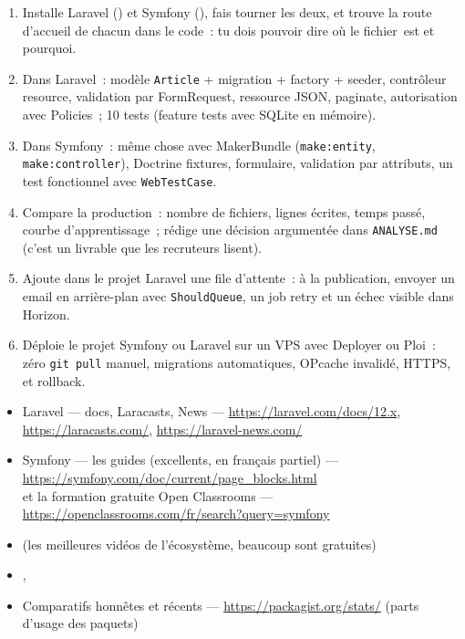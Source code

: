 \begin{exercice}
\begin{enumerate}
  \item Installe Laravel () et Symfony
        (), fais tourner les deux,
        et trouve la route d'accueil de chacun dans le code~: tu dois pouvoir dire o\`u le
        fichier\ est et pourquoi.
  \item Dans Laravel~: mod\`ele \verb|Article| + migration + factory + seeder, contr\^oleur resource,
        validation par FormRequest, ressource JSON, paginate, autorisation avec Policies~;
        10 tests (feature tests avec SQLite en m\'emoire).
  \item Dans Symfony~: m\^eme chose avec MakerBundle (\verb|make:entity|, \verb|make:controller|),
        Doctrine fixtures, formulaire, validation par attributs, un test fonctionnel avec
        \verb|WebTestCase|.
  \item Compare la production~: nombre de fichiers, lignes \'ecrites, temps pass\'e, courbe
        d'apprentissage~; r\'edige une d\'ecision argument\'ee dans \verb|ANALYSE.md| (c'est un livrable
        que les recruteurs lisent).
  \item Ajoute dans le projet Laravel une file d'attente~: \`a la publication, envoyer un email en
        arri\`ere-plan avec \verb|ShouldQueue|, un job retry et un \'echec visible dans Horizon.
  \item D\'eploie le projet Symfony ou Laravel sur un VPS avec Deployer ou Ploi~: z\'ero
        \verb|git pull| manuel, migrations automatiques, OPcache invalid\'e, HTTPS, et rollback.
\end{enumerate}
\end{exercice}

\begin{ressources}
\begin{itemize}
  \item Laravel --- docs, Laracasts, News --- \url{https://laravel.com/docs/12.x}, \url{https://laracasts.com/}, \url{https://laravel-news.com/}
  \item Symfony --- les guides (excellents, en fran\c{c}ais partiel) --- \url{https://symfony.com/doc/current/page_blocks.html} \\
        et la formation gratuite Open Classrooms --- \url{https://openclassrooms.com/fr/search?query=symfony}
  \item {} (les meilleures vid\'eos de l'\'ecosyst\`eme, beaucoup sont gratuites)
  \item {}, 
  \item Comparatifs honn\^etes et r\'ecents --- \url{https://packagist.org/stats/} (parts d'usage des paquets)
\end{itemize}
\end{ressources}

